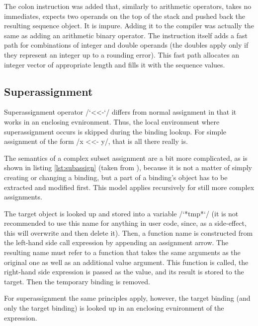 The colon instruction was added that, similarly to arithmetic operators, takes no immediates, expects two operands on the top of the stack and pushed back the resulting sequence object. It is impure. Adding it to the compiler was actually the same as adding an arithmetic binary operator. The instruction itself adds a fast path for combinations of integer and double operands (the doubles apply only if they represent an integer up to a rounding error). This fast path allocates an integer vector of appropriate length and fills it with the sequence values.




\subsection{Superassignment}

Superassignment operator \rinline/`<<-`/ differs from normal assignment in that it works in an enclosing evnironment. Thus, the local environment where superassignment occurs is skipped during the binding lookup. For simple assignment of the form \rinline/x <<- y/, that is all there really is.

The semantics of a complex subset assignment are a bit more complicated, as is shown in listing \ref{lst:subassign} (taken from \autocite{subset}), because it is not a matter of simply creating or changing a binding, but a part of a binding's object has to be extracted and modified first. This model applies recursively for still more complex assignments.

The target object is looked up and stored into a variable \rinline/`*tmp*`/ (it is not recommended to use this name for anything in user code, since, as a side-effect, this will overwrite and then delete it). Then, a function name is constructed from the left-hand side call expression by appending an assignment arrow. The resulting name must refer to a function that takes the same arguments as the original one as well as an additional value argument. This function is called, the right-hand side expression is passed as the value, and its result is stored to the target. Then the temporary binding is removed.

For superassignment the same principles apply, however, the target binding (and only the target binding) is looked up in an enclosing evnironment of the expression.

